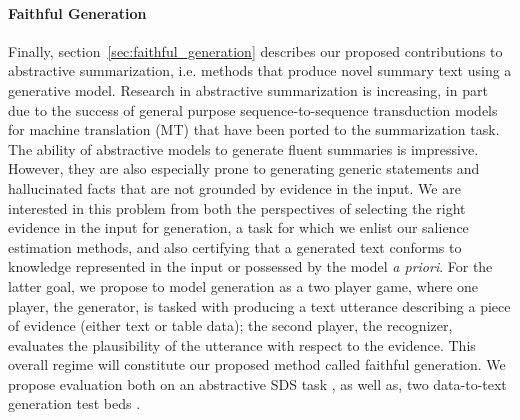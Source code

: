 \paragraph{Faithful Generation} Finally, section~\ref{sec:faithful_generation} describes our proposed 
contributions to
abstractive summarization, i.e. methods that produce novel 
summary text using a generative model. 
Research in abstractive summarization is increasing, in part due to
the success of general purpose sequence-to-sequence transduction models 
for machine translation (MT) that have been ported to the summarization task.
The ability of abstractive models to generate fluent 
summaries is impressive. However, they are also especially prone 
to generating generic statements and hallucinated facts that are not grounded 
by evidence in the input. %
We are interested in this problem from both the perspectives of selecting
the right evidence in the input for generation, a task for which we enlist
our salience estimation methods, and also certifying that a generated text
conforms to knowledge represented in the input or possessed by the model
\textit{a priori}. For the latter goal, we propose to model generation as a two player
game, where one player, the generator, is tasked with producing a text
utterance describing a piece of evidence (either text or table data);
the second player, the recognizer, %
evaluates the plausibility of the utterance with respect to the evidence.
This overall regime will constitute our proposed method called
 faithful generation.
We propose 
evaluation both on an abstractive SDS task \cite{volske2017tl}, 
as well as, two data-to-text generation 
test beds \cite{lebret2016neural,novikova2017e2e}.





